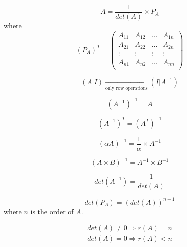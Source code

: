       \[
        A = \frac{1}{det(A)} \times P_{A}
      \]
      where
      \[
        (P_{A})^{T} =
        \begin{pmatrix}
          A_{11} & A_{12} & \ldots & A_{1n} \\
          A_{21} & A_{22} & \ldots & A_{2n} \\
          \vdots & \vdots & \vdots & \vdots \\
          A_{n1} & A_{n2} & \ldots & A_{nn} \\
        \end{pmatrix}
      \]

    \[ 
      (A|I) \xrightarrow[\text{only row operations}]{} (I|A^{-1})
    \] 
  \hiiEND

      \[
        (A^{-1})^{-1} = A
      \]

      \[
        (A^{-1})^{T} = (A^{T})^{-1}
      \]

      \[
        (\alpha A)^{-1} = \frac{1}{\alpha} \times A^{-1}
      \]
    
      \[
        (A \times B)^{-1} = A^{-1} \times B^{-1}
      \]

      \[
        det(A^{-1}) = \frac{1}{det(A)}
      \]

      \[
        det(P_{A}) = (det(A))^{n - 1}
      \]
      where $n$ is the order of $A$.

      \begin{align*}
        det(A) \neq 0 \Rightarrow r(A) = n \\
        det(A) = 0 \Rightarrow r(A) < n \\
      \end{align*}

  \hiiEND
